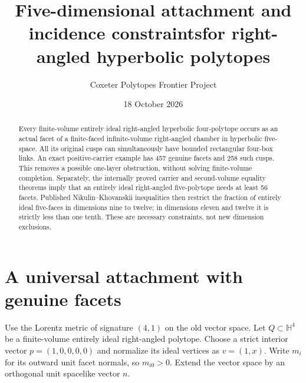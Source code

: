 \documentclass[11pt]{article}
\title{Five-dimensional attachment and incidence constraints\linebreak for right-angled hyperbolic polytopes}
\author{Coxeter Polytopes Frontier Project}
\date{18 October 2026}
\begin{document}
\maketitle
\begin{abstract}
Every finite-volume entirely ideal right-angled hyperbolic four-polytope
occurs as an actual facet of a finite-faced infinite-volume right-angled
chamber in hyperbolic five-space. All its original cusps can simultaneously
have bounded rectangular four-box links. An exact positive-carrier example
has 457 genuine facets and 258 such cusps. This removes a possible
one-layer obstruction, without solving finite-volume completion.
Separately, the internally proved carrier and second-volume equality
theorems imply that an entirely ideal right-angled five-polytope needs at
least 56 facets. Published Nikulin--Khovanskii inequalities then restrict
the fraction of entirely ideal five-faces in dimensions nine to twelve;
in dimensions eleven and twelve it is strictly less than one tenth.
These are necessary constraints, not new dimension exclusions.
\end{abstract}

\section{A universal attachment with genuine facets}
Use the Lorentz metric of signature $(4,1)$ on the old vector space.
Let $Q\subset\mathbb H^4$ be a finite-volume entirely ideal right-angled
polytope. Choose a strict interior vector $p=(1,0,0,0,0)$ and normalize
its ideal vertices as $v=(1,x)$. Write $m_i$ for its outward unit facet
normals, so $m_{i0}>0$. Extend the vector space by an orthogonal unit
spacelike vector $n$.
\end{document}
